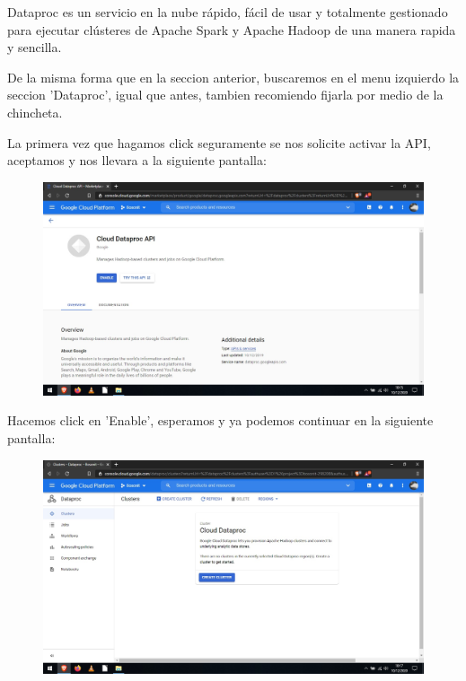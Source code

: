 \documentclass[a4paper,10pt]{article}
\begin{document}
Dataproc es un servicio en la nube rápido, fácil de usar y totalmente gestionado para ejecutar clústeres de Apache Spark y Apache Hadoop de una manera rapida y sencilla.

De la misma forma que en la seccion anterior, buscaremos en el menu izquierdo la seccion 'Dataproc', igual que antes, tambien recomiendo fijarla por medio de la chincheta. 

La primera vez que hagamos click seguramente se nos solicite activar la API, aceptamos y nos llevara a la siguiente pantalla:

\begin{figure}[H]
\begin{center}
\includegraphics[width=500pt]{./fotos/GoogleCloud/21 - GC.jpg}
\end{center}
\end{figure}

Hacemos click en 'Enable', esperamos y ya podemos continuar en la siguiente pantalla:

\begin{figure}[H]
\begin{center}
\includegraphics[width=500pt]{./fotos/GoogleCloud/22 - GC.jpg}
\end{center}
\end{figure}
\end{document}
